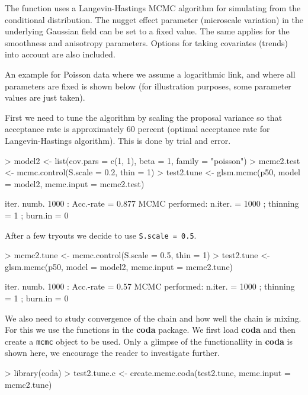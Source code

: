 \documentclass[12pt,a4paper]{article}
\newcommand{\strong}[1]{{\textbf{ #1}}}
\let\pkg=\strong
\newcommand{\code}[1]{\texttt{\small #1}}
\begin{document}
The function uses a Langevin-Hastings MCMC algorithm for simulating from the conditional distribution.
The nugget effect parameter (microscale variation) in the underlying Gaussian field can be set to a fixed value. 
The same applies for the smoothness and anisotropy parameters. Options for taking covariates (trends) into 
account are also included.

An example for Poisson data where we assume a logarithmic link, and
where all parameters are fixed is shown below 
(for illustration purposes, some parameter values are just taken).  

First we need to tune the algorithm by scaling the proposal variance so that acceptance rate is approximately 60 percent (optimal
acceptance rate for Langevin-Hastings algorithm). This is done by trial and error. 
\begin{Schunk}
\begin{Sinput}
> model2 <- list(cov.pars = c(1, 1), beta = 1, family = "poisson")
> mcmc2.test <- mcmc.control(S.scale = 0.2, thin = 1)
> test2.tune <- glsm.mcmc(p50, model = model2, mcmc.input = mcmc2.test)
\end{Sinput}
\begin{Soutput}
iter. numb. 1000  : Acc.-rate =  0.877 
MCMC performed: n.iter. =  1000 ; thinning =  1 ; burn.in =  0 
\end{Soutput}
\end{Schunk}
After a few tryouts we decide to use \code{S.scale = 0.5}.
\begin{Schunk}
\begin{Sinput}
> mcmc2.tune <- mcmc.control(S.scale = 0.5, thin = 1)
> test2.tune <- glsm.mcmc(p50, model = model2, mcmc.input = mcmc2.tune)
\end{Sinput}
\begin{Soutput}
iter. numb. 1000  : Acc.-rate =  0.57 
MCMC performed: n.iter. =  1000 ; thinning =  1 ; burn.in =  0 
\end{Soutput}
\end{Schunk}
We also need to study convergence of the chain and how well the chain
is mixing. For this we use the functions in the \pkg{coda} package. We
first load \pkg{coda} and then create a \code{mcmc} object to
be used. Only a glimpse of the functionallity in \pkg{coda} is shown
here, we encourage the reader to investigate further.

\begin{Schunk}
\begin{Sinput}
> library(coda)
> test2.tune.c <- create.mcmc.coda(test2.tune, mcmc.input = mcmc2.tune)
\end{Sinput}
\end{Schunk}
\end{document}
